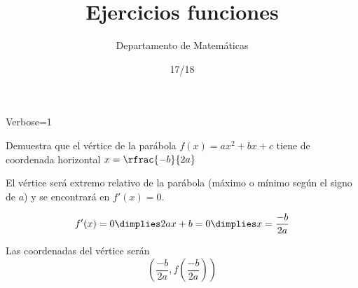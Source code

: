 \documentclass[palatino,nosec]{Docencia}
\title{Ejercicios funciones}
\author{Departamento de Matemáticas}
\date{17/18}
\begin{document}
\pagestyle{plain}


\newif\ifverbose
\verbosetrue
\ifverbose
\begin{sagesilent}
	Verbose=1
\end{sagesilent}
\else
\begin{sagesilent}
	Verbose=0
\end{sagesilent}
\fi



\begin{problem} Demuestra que el vértice de la parábola $f(x) = ax^2+bx+c$ tiene de coordenada horizontal $x=\rfrac{-b}{2a}$
\solution

El vértice será extremo relativo de la parábola (máximo o mínimo según el signo de $a$) y se encontrará en $f'(x) = 0$.

\[f'(x) = 0 \dimplies 2ax+b=0 \dimplies x=\frac{-b}{2a}\]

Las coordenadas del vértice serán \[\left(\frac{-b}{2a},f\left(\frac{-b}{2a}\right) \right)\]


\end{problem}
\end{document}
